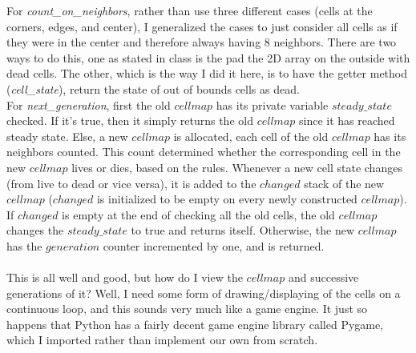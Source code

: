 \documentclass[12pt]{report}
\begin{document}
For \emph{count\_on\_neighbors}, rather than use three different cases (cells at the corners, edges, and center), I generalized
the cases to just consider all cells as if they were in the center and therefore always having 8 neighbors. 
There are two ways to do this, one as stated in class is the pad the 2D array on the outside with dead cells.
The other, which is the way I did it here, is to have the getter method (\emph{cell\_state}), return the state of 
out of bounds cells as dead.\\

For \emph{next\_generation}, first the old $cellmap$ has its private variable $steady\_state$ checked.
If it's true, then it simply returns the old $cellmap$ since it has reached steady state.
Else, a new $cellmap$ is allocated, each cell of the old $cellmap$ has its neighbors counted.
This count determined whether the corresponding cell in the new $cellmap$ lives or dies, based on the rules. 
Whenever a new cell state changes (from live to dead or vice versa), it is added to the $changed$ stack of the new $cellmap$ 
($changed$ is initialized to be empty on every newly constructed $cellmap$).
If $changed$ is empty at the end of checking all the old cells, the old $cellmap$ changes the $steady\_state$ to true and returns
itself. Otherwise, the new $cellmap$ has the $generation$ counter incremented by one, and is returned.\\\\
This is all well and good, but how do I view the $cellmap$ and successive generations of it?
Well, I need some form of drawing/displaying of the cells on a continuous loop, and this sounds very much like a game engine.
It just so happens that Python has a fairly decent game engine library called Pygame, which I imported rather than implement our own from scratch.\cite{pygame}
\end{document}
